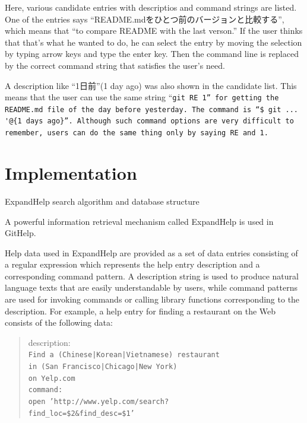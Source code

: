 \documentclass{sigchi}
\def\GH{\textsf{GitHelp}}
\def\EH{\textsf{ExpandHelp}}
\begin{document}
Here, various candidate entries with
descriptios and command strings are listed.
One of the entries says ``README.mdをひとつ前のバージョンと比較する'',
which means that ``to compare README with the last verson.''
%
If the user thinks that that's what he wanted to do,
he can select the entry by moving the selection by typing arrow keys
and type the enter key.
Then the command line is replaced by the correct command string
that satisfies the user's need.

A description like ``1日前''(1 day ago) was also shown in the candidate list.
This means that the user can use the same string ``\tt{git RE 1}''
for getting the README.md file of the day before yesterday.
The command is ``\verb|$ git ... '@{1 days ago}|''.
Although such command options are very difficult to remember,
users can do the same thing only by saying \tt{RE} and \tt{1}.


\section{Implementation}

{\EH} search algorithm and database structure


A powerful information retrieval mechanism called {\EH} is used in {\GH}.

Help data used in {\EH} are provided as a set of data entries
consisting of a regular expression which represents the help entry description
and a corresponding command pattern.
A description string is used to produce natural language texts
that are easily understandable by users,
while command patterns are used for invoking commands or calling library functions
corresponding to the description.
%
For example, a help entry for finding a restaurant on the Web consists of
the following data:

\begin{quote}
  description: \\
  \tt{Find a (Chinese|Korean|Vietnamese) restaurant \\  in (San Francisco|Chicago|New York) \\  on Yelp.com} \\
  command: \\
  \tt{open 'http://www.yelp.com/search?\\  find\_loc=\$2\&find\_desc=\$1'}
\end{quote}
\end{document}
